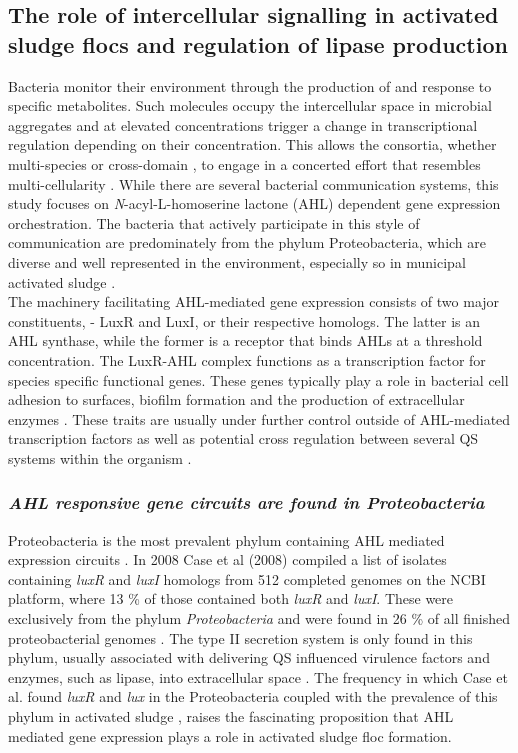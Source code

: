 \documentclass[twoside]{article}
\begin{document}
\subsection{The role of intercellular signalling in activated sludge flocs and regulation of lipase production}
Bacteria monitor their environment through the production of and response to specific metabolites. Such molecules occupy the intercellular space in microbial aggregates and at elevated concentrations trigger a change in transcriptional regulation depending on their concentration. This allows the consortia, whether multi-species or cross-domain \citep{williams2007quorum}, to engage in a concerted effort that resembles multi-cellularity \cite{kjelleberg2002}. While there are several bacterial communication systems, this study focuses on \emph{N}-acyl-L-homoserine lactone (AHL) dependent gene expression orchestration. The bacteria that actively participate in this style of communication are predominately from the phylum Proteobacteria, which are diverse and well represented in the environment, especially so in municipal activated sludge \cite{Hesham_11,Wagner_02}.  \\


The machinery facilitating AHL-mediated gene expression consists of two major constituents, - LuxR and LuxI, or their respective homologs. The latter is an AHL synthase, while the former is a receptor that binds AHLs at a threshold concentration. The LuxR-AHL complex functions as a transcription factor for species specific functional genes. These genes typically play a role in bacterial cell adhesion to surfaces, biofilm formation and the production of extracellular enzymes \cite{Flemming_10}.
These traits are usually under further control outside of AHL-mediated transcription factors as well as potential cross regulation between several QS systems within the organism \cite{juhas2005}.


\subsubsection{\emph{AHL responsive gene circuits are found in Proteobacteria}}
Proteobacteria is the most prevalent phylum containing AHL mediated expression circuits \cite{gelencser_12}. In 2008 Case et al (2008) compiled a list of isolates containing \emph{luxR} and \emph{luxI} homologs from 512 completed genomes on the NCBI platform, where 13 \% of those contained both \emph{luxR} and \emph{luxI}. These were exclusively from the phylum \emph{Proteobacteria} and were found in 26 \% of all finished proteobacterial genomes \cite{case_08}.
The type II secretion system is only found in this phylum, usually associated with delivering QS influenced virulence factors and enzymes, such as lipase, into extracellular space \cite{sandkvist2001}. 
The frequency in which Case et al. found \emph{luxR} and \emph{lux} in the Proteobacteria \cite{case_08} coupled with the prevalence of this phylum in activated sludge \cite{Wagner_02,Hesham_11}, raises the fascinating proposition that AHL mediated gene expression plays a role in activated sludge floc formation.
\end{document}
